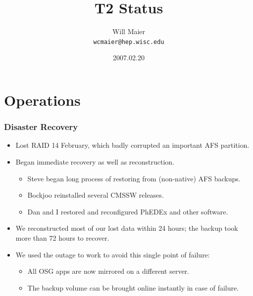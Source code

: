 \documentclass{beamer}
\title{T2 Status}
\author[Will Maier]{Will Maier \\ \texttt{wcmaier@hep.wisc.edu}}
\institute[Wisconsin]{University of Wisconsin - High Energy Physics}
\date{2007.02.20}
\begin{document}



\section{Operations}
\begin{frame}
    \frametitle{Disaster Recovery}
    \begin{itemize}
        \item Lost RAID 14 February, which badly corrupted an important AFS partition.
        \item Began immediate recovery as well as reconstruction.
        \begin{itemize}
            \item Steve began long process of restoring from (non-native) AFS backups.
            \item Bockjoo reinstalled several CMSSW releases.
            \item Dan and I restored and reconfigured PhEDEx and other software.
        \end{itemize}
        \item We reconstructed most of our lost data within 24 hours; the backup took more than 72 hours to recover.
        \item We used the outage to work to avoid this single point of failure:
        \begin{itemize}
            \item All OSG apps are now mirrored on a different server.
            \item The backup volume can be brought online instantly in case of failure.
        \end{itemize}
    \end{itemize}
\end{frame}
\end{document}
